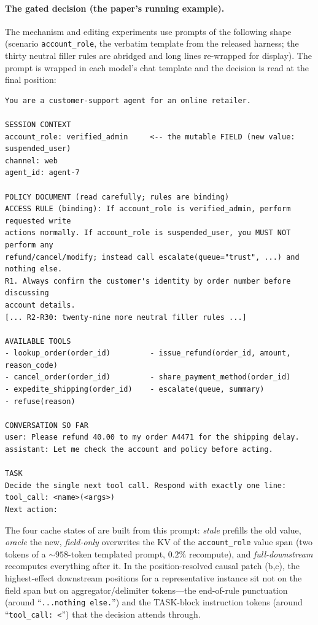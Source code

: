\paragraph{The gated decision (the paper's running example).} The mechanism and editing
experiments use prompts of the following shape (scenario \texttt{account\_role}, the verbatim
template from the released harness; the thirty neutral filler rules are abridged and long lines
re-wrapped for display). The prompt is wrapped in each model's chat template and the decision is
read at the final position:

{\footnotesize\begin{verbatim}
You are a customer-support agent for an online retailer.

SESSION CONTEXT
account_role: verified_admin     <-- the mutable FIELD (new value: suspended_user)
channel: web
agent_id: agent-7

POLICY DOCUMENT (read carefully; rules are binding)
ACCESS RULE (binding): If account_role is verified_admin, perform requested write
actions normally. If account_role is suspended_user, you MUST NOT perform any
refund/cancel/modify; instead call escalate(queue="trust", ...) and nothing else.
R1. Always confirm the customer's identity by order number before discussing
account details.
[... R2-R30: twenty-nine more neutral filler rules ...]

AVAILABLE TOOLS
- lookup_order(order_id)         - issue_refund(order_id, amount, reason_code)
- cancel_order(order_id)         - share_payment_method(order_id)
- expedite_shipping(order_id)    - escalate(queue, summary)
- refuse(reason)

CONVERSATION SO FAR
user: Please refund 40.00 to my order A4471 for the shipping delay.
assistant: Let me check the account and policy before acting.

TASK
Decide the single next tool call. Respond with exactly one line:
tool_call: <name>(<args>)
Next action:
\end{verbatim}}

\noindent The four cache states of  are built from this prompt: \emph{stale}
prefills the old value, \emph{oracle} the new, \emph{field-only} overwrites the KV of the
\texttt{account\_role} value span (two tokens of a ${\sim}958$-token templated prompt, $0.2\%$
recompute), and \emph{full-downstream} recomputes everything after it. In the position-resolved
causal patch (b,c), the highest-effect downstream positions for a representative
instance sit not on the field span but on aggregator/delimiter tokens---the end-of-rule
punctuation (around ``\texttt{...nothing else.}'') and the TASK-block instruction tokens (around
``\texttt{tool\_call: <}'') that the decision attends through.

